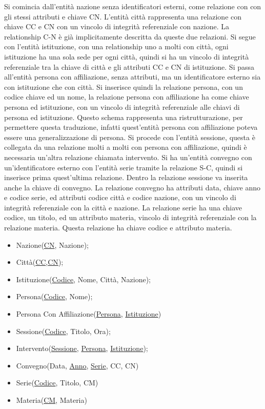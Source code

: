 \documentclass{article}
\numberwithin{equation}{subsection}
\begin{document}
Si comincia dall'entità nazione senza identificatori esterni, come relazione con con gli stessi attributi e chiave CN. L'entità città rappresenta una 
relazione con chiave CC e CN con un vincolo di integrità referenziale con nazione. La relationship C-N è già implicitamente descritta 
da queste due relazioni. Si segue con l'entità istituzione, con una relationship uno a molti con città, ogni istituzione ha una sola 
sede per ogni città, quindi si ha un vincolo di integrità referenziale tra la chiave di città e gli attributi CC e CN di istituzione. Si passa 
all'entità persona con affiliazione, senza attributi, ma un identificatore esterno sia con istituzione che con città. Si inserisce quindi 
la relazione persona, con un codice chiave ed un nome, la relazione persona con affiliazione ha come chiave persona ed istituzione, con un vincolo di 
integrità referenziale alle chiavi di persona ed istituzione. Questo schema rappresenta una ristrutturazione, per permettere questa traduzione, 
infatti quest'entità persona con affiliazione poteva essere una generalizzazione di persona. Si procede con l'entità sessione, questa è collegata 
da una relazione molti a molti con persona con affiliazione, quindi è necessaria un'altra relazione chiamata intervento. 
Si ha un'entità convegno con un'identificatore esterno con l'entità serie tramite la relazione S-C, quindi si inserisce prima quest'ultima 
relazione. Dentro la relazione sessione va inserita anche la chiave di convegno. La relazione convegno ha attributi data, chiave anno e codice serie, 
ed attributi codice città e codice nazione, con un vincolo di integrità referenziale con la città e nazione. La relazione serie ha una chiave codice, 
un titolo, ed un attributo materia, vincolo di integrità referenziale con la relazione materia. Questa relazione ha chiave codice e attributo 
materia. 

\begin{itemize}
    \item Nazione(\underline{CN}, Nazione);
    \item Città(\underline{CC},\underline{CN});
    \item Istituzione(\underline{Codice}, Nome, Città, Nazione);
    \item Persona(\underline{Codice}, Nome);
    \item Persona Con Affiliazione(\underline{Persona}, \underline{Istituzione})
    \item Sessione(\underline{Codice}, Titolo, Ora);
    \item Intervento(\underline{Sessione}, \underline{Persona}, \underline{Istituzione});
    \item Convegno(Data, \underline{Anno}, \underline{Serie}, CC, CN)
    \item Serie(\underline{Codice}, Titolo, CM)
    \item Materia(\underline{CM}, Materia)
\end{itemize}
\end{document}
